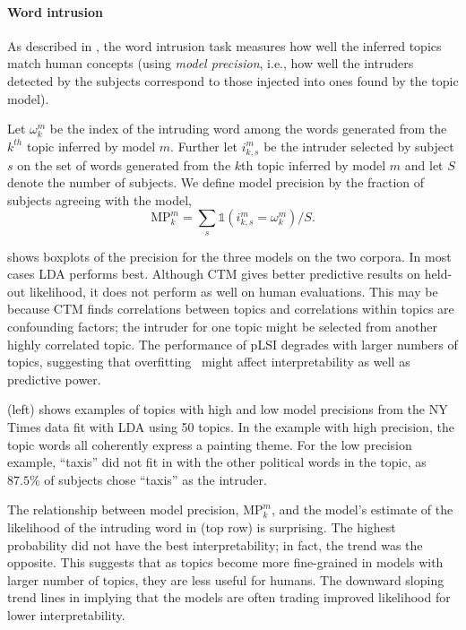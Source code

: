 \paragraph{Word intrusion}
As described in , the word intrusion task
measures how well the inferred topics match human concepts (using
\emph{model precision}, i.e., how well the intruders detected by the
subjects correspond to those injected into ones found by the topic model).  

Let $\omega^{m}_{k}$ be the index of the intruding word among the words generated
from the $k^{th}$ topic inferred by model $m$.  Further let $i^m_{k, s}$ be
the intruder selected by subject $s$ on the set of words generated from the
$k$th topic inferred by model $m$ and let $S$ denote the number of subjects.  We
define model precision by the fraction of subjects agreeing with the model,
\begin{equation}
  \mathrm{MP}^m_k = \textstyle \sum_{s} \mathds{1}(i^m_{k,s} = \omega^{m}_{k}) / S.
  \label{eq:mp}
\end{equation}


 shows boxplots of the precision for the three
models on the two corpora.  In most cases LDA performs best. Although
CTM gives better predictive results on held-out likelihood, it does
not perform as well on human evaluations. This may be because CTM
finds correlations between topics and correlations within topics are
confounding factors; the intruder for one topic might be selected from
another highly correlated topic.  The performance of pLSI degrades
with larger numbers of topics, suggesting that
overfitting~\cite{blei-03} might affect interpretability as well as
predictive power.

 (left) shows examples of topics with high
and low model precisions from the NY Times data fit with LDA using 50
topics. In the example with high precision, the topic words all
coherently express a painting theme.  For the low precision example,
 ``taxis'' did not fit in with the other
political words in the topic, as $87.5\%$ of subjects chose ``taxis''
as the intruder.


The relationship between model precision, $\mathrm{MP}^m_k$, and the
model's estimate of the likelihood of the intruding word in
 (top row) is surprising.  The highest
probability did not have the best interpretability; in fact, the trend
was the opposite.  This suggests that as topics become more
fine-grained in models with larger number of topics, they are less
useful for humans.  The downward sloping trend lines in
 implying that the models are often trading
improved likelihood for lower interpretability.



